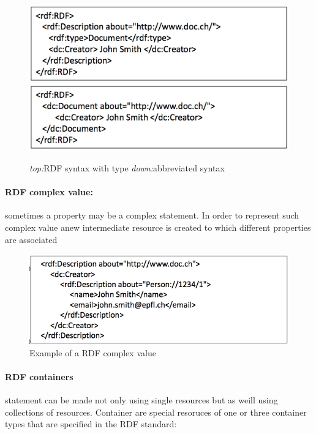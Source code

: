 \begin{figure}[H]
\begin{center}
\includegraphics[width=1\linewidth]{figures/type.png}
\includegraphics[width= 1\linewidth]{figures/abbr.png}
\end{center}
\caption{\textit{top:}RDF syntax with type \textit{down:}abbreviated syntax}
\end{figure}

\paragraph{RDF complex value:} sometimes a property may be a complex statement. In order to represent such complex value anew intermediate resource is created to which different properties are associated

\begin{figure}[H]
\begin{center}
\includegraphics[width=1\linewidth]{figures/complexRDF.png}
\end{center}
\caption{Example of a RDF complex value}
\end{figure}

\paragraph{RDF containers}statement can be made not only using single resources but  as weill using collections of resources. Container are special resoruces of one or three container types that are specified in the RDF standard:

